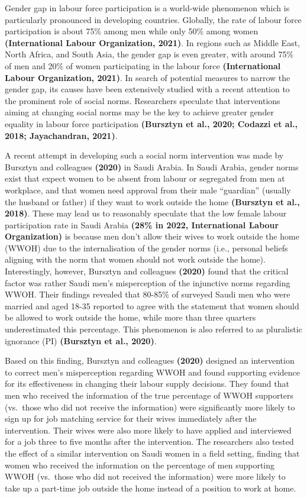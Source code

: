 \documentclass[
  11pt,
]{article}
\begin{document}
Gender gap in labour force participation is a world-wide phenomenon
which is particularly pronounced in developing countries. Globally, the
rate of labour force participation is about 75\% among men while only
50\% among women \textbf{(International Labour Organization, 2021)}. In
regions such as Middle East, North Africa, and South Asia, the gender
gap is even greater, with around 75\% of men and 20\% of women
participating in the labour force \textbf{(International Labour
Organization, 2021)}. In search of potential measures to narrow the
gender gap, its causes have been extensively studied with a recent
attention to the prominent role of social norms. Researchers speculate
that interventions aiming at changing social norms may be the key to
achieve greater gender equality in labour force participation
\textbf{(Bursztyn et al., 2020; Codazzi et al., 2018; Jayachandran,
2021)}.

A recent attempt in developing such a social norm intervention was made
by Bursztyn and colleagues \textbf{(2020)} in Saudi Arabia. In Saudi
Arabia, gender norms exist that expect women to be absent from labour or
segregated from men at workplace, and that women need approval from
their male ``guardian'' (usually the husband or father) if they want to
work outside the home \textbf{(Bursztyn et al., 2018)}. These may lead
us to reasonably speculate that the low female labour participation rate
in Saudi Arabia \textbf{(28\% in 2022, International Labour
Organization)} is because men don't allow their wives to work outside
the home (WWOH) due to the internalisation of the gender norms (i.e.,
personal beliefs aligning with the norm that women should not work
outside the home). Interestingly, however, Bursztyn and colleagues
\textbf{(2020)} found that the critical factor was rather Saudi men's
misperception of the injunctive norms regarding WWOH. Their findings
revealed that 80-85\% of surveyed Saudi men who were married and aged
18-35 reported to agree with the statement that women should be allowed
to work outside the home, while more than three quarters underestimated
this percentage. This phenomenon is also referred to as pluralistic
ignorance (PI) \textbf{(Bursztyn et al., 2020)}.

Based on this finding, Bursztyn and colleagues \textbf{(2020)} designed
an intervention to correct men's misperception regarding WWOH and found
supporting evidence for its effectiveness in changing their labour
supply decisions. They found that men who received the information of
the true percentage of WWOH supporters (vs.~those who did not receive
the information) were significantly more likely to sign up for job
matching service for their wives immediately after the intervention.
Their wives were also more likely to have applied and interviewed for a
job three to five months after the intervention. The researchers also
tested the effect of a similar intervention on Saudi women in a field
setting, finding that women who received the information on the
percentage of men supporting WWOH (vs.~those who did not received the
information) were more likely to take up a part-time job outside the
home instead of a position to work at home.
\end{document}
